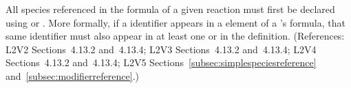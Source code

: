 All species referenced in the \StoichiometryMath formula of a given reaction
must first be declared using \SpeciesReference or \ModifierSpeciesReference.
More formally, if a \Species identifier appears in a  element of a
\Reaction's \StoichiometryMath formula, that same identifier must also appear
in at least one \SpeciesReference or \ModifierSpeciesReference in the
\Reaction definition.  (References: L2V2 Sections~4.13.2 and~4.13.4; L2V3
Sections~4.13.2 and~4.13.4; L2V4 Sections~4.13.2 and~4.13.4; L2V5
Sections~\ref{subsec:simplespeciesreference}
and~\ref{subsec:modifierreference}.)
